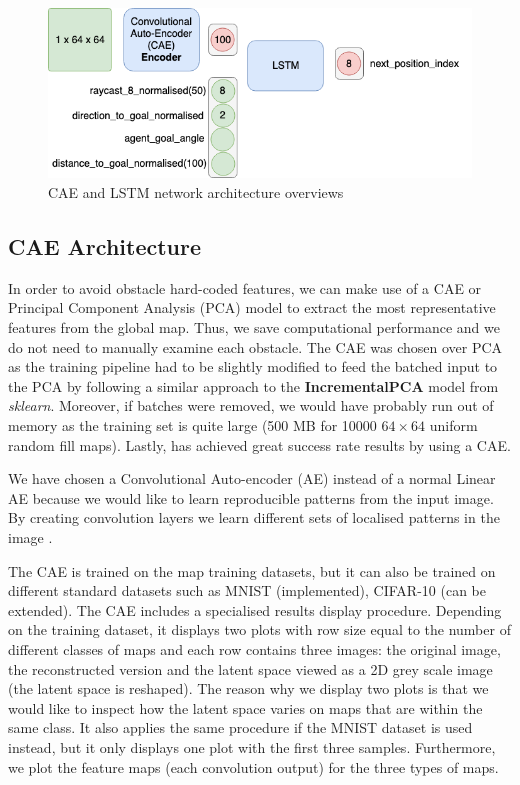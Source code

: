 \begin{figure}[h!]
    \centering
    \includegraphics[scale=0.5]{images/caelstm_full.png}
    \caption{CAE and LSTM network architecture overviews}
    \label{fig:caelstm_full}
\end{figure}

\subsection{CAE Architecture}

In order to avoid obstacle hard-coded features, we can make use of a CAE \cite{holden2015learning, ml} or Principal Component Analysis (PCA) \cite{jolliffe2011principal, wold1987principal} model to extract the most representative features from the global map. Thus, we save computational performance and we do not need to manually examine each obstacle. The CAE was chosen over PCA as the training pipeline had to be slightly modified to feed the batched input to the PCA by following a similar approach to the \textbf{IncrementalPCA} model from \textit{sklearn}. Moreover, if batches were removed, we would have probably run out of memory as the training set is quite large (500 MB for 10000 $64\times64$ uniform random fill maps). Lastly, \cite{inoue2019robot} has achieved great success rate results by using a CAE.

We have chosen a Convolutional Auto-encoder (AE) instead of a normal Linear AE because we would like to learn reproducible patterns from the input image. By creating convolution layers we learn different sets of localised patterns in the image \cite{holden2015learning, ml}.

The CAE is trained on the map training datasets, but it can also be trained on different standard datasets such as MNIST \cite{mnist} (implemented), CIFAR-10 \cite{cifar_10} (can be extended). The CAE includes a specialised results display procedure. Depending on the training dataset, it displays two plots with row size equal to the number of different classes of maps and each row contains three images: the original image, the reconstructed version and the latent space viewed as a 2D grey scale image (the latent space is reshaped). The reason why we display two plots is that we would like to inspect how the latent space varies on maps that are within the same class. It also applies the same procedure if the MNIST dataset is used instead, but it only displays one plot with the first three samples. Furthermore, we plot the feature maps (each convolution output) for the three types of maps.

